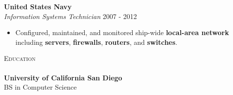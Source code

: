 \documentclass[a4paper]{article}
\newcommand{\lineunder} {
    \vspace*{-8pt} \\
    \hspace*{-18pt} \hrulefill \\
}
\newcommand{\header} [1] {
    {\hspace*{-18pt}\vspace*{6pt} \textsc{#1}}
    \vspace*{-6pt} \lineunder
}
\begin{document}
\textbf{United States Navy} \hfill \\
\textit{Information Systems Technician} \hfill 2007 - 2012\\
\vspace{-1mm}
\begin{itemize} \itemsep 1pt
	\item Configured, maintained, and monitored ship-wide \textbf{local-area network} including \textbf{servers}, \textbf{firewalls}, \textbf{routers}, and \textbf{switches}.
\end{itemize}

\header{Education}
\textbf{University of California San Diego}\hfill \\
BS in Computer Science \hfill \\

\vspace{2mm}
\end{document}
